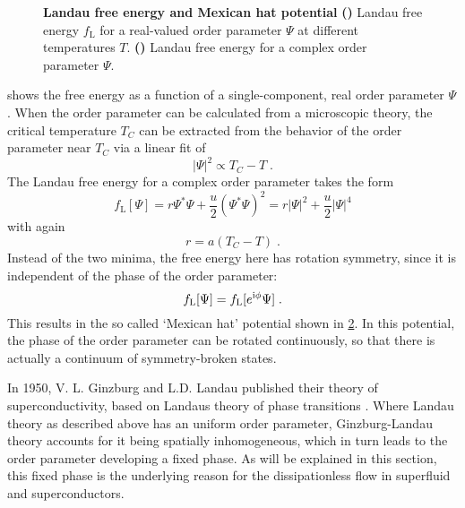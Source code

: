 \documentclass[../notes.tex]{subfiles}
\begin{document}
\begin{figure}[t]
	\centering
	\begin{subfigure}[b]{0.5\textwidth}
		\centering
		\caption{\hfill\null}\label{sfig:Landau free energy}
		
	\end{subfigure}%
	\begin{subfigure}[b]{0.5\textwidth}
		\centering
		\caption{\hfill\null}\label{sfig:Ginzburg Landau free energy}
		
	\end{subfigure}
	\caption{
		\textbf{Landau free energy and Mexican hat potential} \textbf{()} Landau free energy \(f_{\mathrm{L}}\) for a real-valued order parameter \(\Psi\) at different temperatures \(T\). \textbf{()} Landau free energy for a complex order parameter \(\Psi\).
	} 
	\label{fig:Landau free energy and Ginzburg-Landau free energy}
\end{figure}

 shows the free energy as a function of a single-component, real order parameter \(\Psi\).
When the order parameter can be calculated from a microscopic theory, the critical temperature \(T_C\) can be extracted from the behavior of the order parameter near \(T_C\) via a linear fit of
\begin{equation}
	\vert \Psi \vert^2 \propto T_C - T \;.
\end{equation}
The Landau free energy for a complex order parameter takes the form
\begin{equation}
	f_{\mathrm{L}} [\Psi] = r \Psi^* \Psi + \frac{u}{2} (\Psi^* \Psi)^2 = r \vert \Psi \vert^2 + \frac{u}{2} \vert \Psi \vert^4
\end{equation}
with again
\begin{equation}
	r = a(T_C - T) \;.
\end{equation}
Instead of the two minima, the free energy here has rotation symmetry, since it is independent of the phase of the order parameter: 
\begin{equation}
	f_{\mathrm{L}} [\Psi] = f_{\mathrm{L}} [e^{\mathrm{i} \phi} \Psi] \;.
\end{equation}
This results in the so called `Mexican hat' potential shown in \cref{sfig:Ginzburg Landau free energy}.
In this potential, the phase of the order parameter can be rotated continuously, so that there is actually a continuum of symmetry-broken states.

In 1950, V. L. Ginzburg and L.D. Landau published their theory of superconductivity, based on Landaus theory of phase transitions \cite{ginzburgTheorySuperconductivity1950}.
Where Landau theory as described above has an uniform order parameter, Ginzburg-Landau theory accounts for it being spatially inhomogeneous, which in turn leads to the order parameter developing a fixed phase.
As will be explained in this section, this fixed phase is the underlying reason for the dissipationless flow in superfluid and superconductors.
\end{document}

